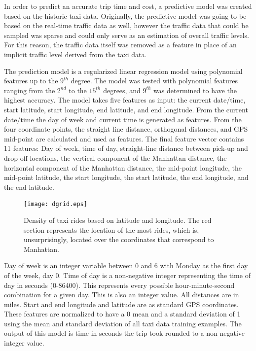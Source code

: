 \documentclass{sig-alternate}
\begin{document}
In order to predict an accurate trip time and cost, a predictive model was created based on the historic taxi data. Originally, the predictive model was going to be based on the real-time traffic data as well, however the traffic data that could be sampled was sparse and could only serve as an estimation of overall traffic levels. For this reason, the traffic data itself was removed as a feature in place of an implicit traffic level derived from the taxi data.
	 	 	 	
The prediction model is a regularized linear regression model using polynomial features up to the $9^{th}$ degree. The model was tested with polynomial features ranging from the $2^{nd}$ to the $15^{th}$ degrees, and $9^{th}$ was determined to have the highest accuracy. The model takes five features as input: the current date/time, start latitude, start longitude, end latitude, and end longitude. From the current date/time the day of week and current time is generated as features. From the four coordinate points, the straight line distance, orthogonal distances, and GPS mid-point are calculated and used as features. The final feature vector contains 11 features: Day of week, time of day, straight-line distance between pick-up and drop-off locations, the vertical component of the Manhattan distance, the horizontal component of the Manhattan distance, the mid-point longitude, the mid-point latitude, the start longitude, the start latitude, the end longitude, and the end latitude.

\begin{figure}
\texttt{[image: dgrid.eps]}
\caption{Density of taxi rides based on latitude and longitude.  The red section represents the location of the most rides, which is, unsurprisingly, located over the coordinates that correspond to Manhattan.}
\end{figure}

Day of week is an integer variable between 0 and 6 with Monday as the first day of the week, day 0. Time of day is a non-negative integer representing the time of day in seconds (0-86400). This represents every possible hour-minute-second combination for a given day. This is also an integer value. All distances are in miles. Start and end longitude and latitude are as standard GPS coordinates. These features are normalized to have a 0 mean and a standard deviation of 1 using the mean and standard deviation of all taxi data training examples. The output of this model is time in seconds the trip took rounded to a non-negative integer value.
\end{document}
